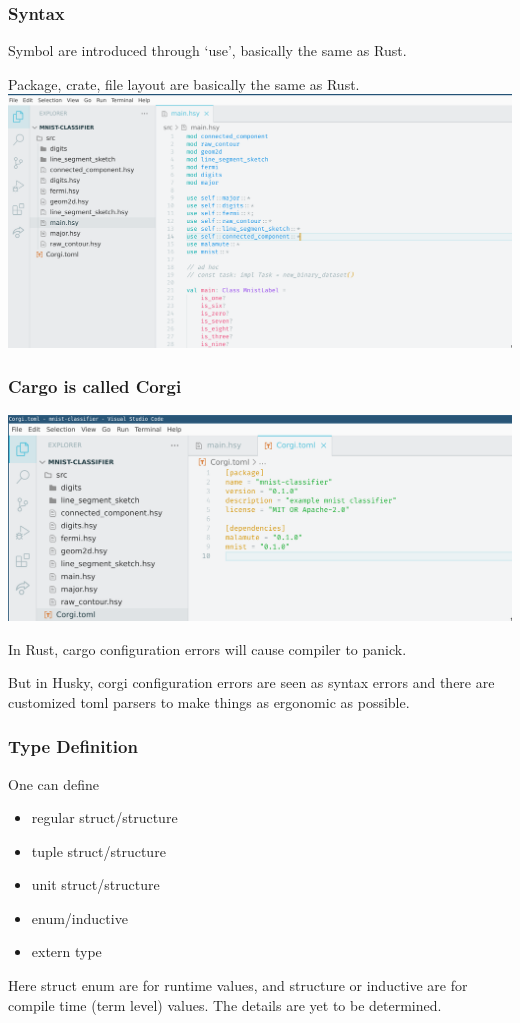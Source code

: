 \documentclass{beamer}   	%
\theoremstyle{definition}
\begin{document}
\begin{frame}
\frametitle{Syntax}

Symbol are introduced through `use', basically the same as Rust.

Package, crate, file layout are basically the same as Rust.
\includegraphics[width=\linewidth]{snapshots/husky_file_structure.png}
\end{frame}

\begin{frame}
\frametitle{Cargo is called Corgi}

\includegraphics[width=\linewidth]{snapshots/husky_cargo_is_called_corgi.png}

In Rust, cargo configuration errors will cause compiler to panick.

But in Husky, corgi configuration errors are seen as syntax errors and there are customized toml parsers to make things as ergonomic as possible.
\end{frame}

\begin{frame}
\frametitle{Type Definition}

One can define
\begin{itemize}
	\item regular struct/structure
	\item tuple struct/structure
	\item unit struct/structure
	\item enum/inductive
	\item extern type
\end{itemize}

Here struct enum are for runtime values, and structure or inductive are for compile time (term level) values. The details are yet to be determined.
\end{frame}
\end{document}
